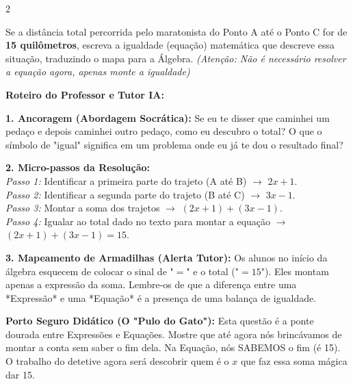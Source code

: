 \begin{multicols*}{2}
\begin{enunciadoLiteral}
Se a distância total percorrida pelo maratonista do Ponto A até o Ponto C for de \textbf{15 quilômetros}, escreva a igualdade (equação) matemática que descreve essa situação, traduzindo o mapa para a Álgebra. \textit{(Atenção: Não é necessário resolver a equação agora, apenas monte a igualdade)}
\end{enunciadoLiteral}

\ifgabarito
    \begin{tcolorbox}[colback=CorTitUm!5, colframe=CorTitUm, boxrule=1pt, arc=4pt, left=6pt, right=6pt, top=6pt, bottom=6pt]
    \small\textbf{\textcolor{CorTitUm}{Roteiro do Professor e Tutor IA:}}\par\vspace{0.1cm}
    \color{CinzaEscuro}
    \textbf{1. Ancoragem (Abordagem Socrática):} Se eu te disser que caminhei um pedaço e depois caminhei outro pedaço, como eu descubro o total? O que o símbolo de "igual" significa em um problema onde eu já te dou o resultado final?\par\vspace{0.1cm}
    
    \textbf{2. Micro-passos da Resolução:}\\
    \textit{Passo 1:} Identificar a primeira parte do trajeto (A até B) $\rightarrow$ $ 2x + 1 $.\\
    \textit{Passo 2:} Identificar a segunda parte do trajeto (B até C) $\rightarrow$ $ 3x - 1 $.\\
    \textit{Passo 3:} Montar a soma dos trajetos $\rightarrow$ $ (2x + 1) + (3x - 1) $.\\
    \textit{Passo 4:} Igualar ao total dado no texto para montar a equação $\rightarrow$ $ (2x + 1) + (3x - 1) = 15 $.\par\vspace{0.1cm}
    
    \textbf{3. Mapeamento de Armadilhas (Alerta Tutor):} Os alunos no início da álgebra esquecem de colocar o sinal de "$=$" e o total ("$= 15$"). Eles montam apenas a expressão da soma. Lembre-os de que a diferença entre uma *Expressão* e uma *Equação* é a presença de uma balança de igualdade.
    \end{tcolorbox}
    \vspace{0.15cm}
    
    \begin{boxexplicacao}
    \textbf{Porto Seguro Didático (O "Pulo do Gato"):} Esta questão é a ponte dourada entre Expressões e Equações. Mostre que até agora nós brincávamos de montar a conta sem saber o fim dela. Na Equação, nós SABEMOS o fim (é 15). O trabalho do detetive agora será descobrir quem é o $x$ que faz essa soma mágica dar 15.
    \end{boxexplicacao}
\fi


\end{multicols*}
